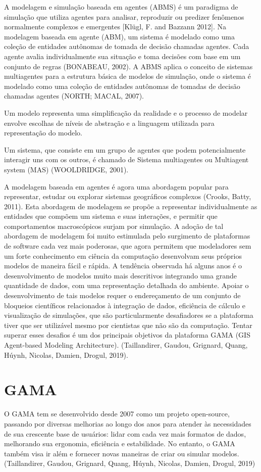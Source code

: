 A modelagem e simulação baseada em agentes (ABMS) é um paradigma de simulação que utiliza agentes para analisar, reproduzir ou predizer fenômenos normalmente complexos e emergentes [Klügl, F. and Bazzann 2012]. Na modelagem baseada em agente (ABM), um sistema é modelado como uma coleção de entidades autônomas de tomada de decisão chamadas agentes. Cada agente avalia individualmente sua situação e toma decisões com base em um conjunto de regras (BONABEAU, 2002). A ABMS aplica o conceito de sistemas multiagentes para a estrutura básica de modelos de simulação, onde o sistema é modelado como
uma coleção de entidades autônomas de tomadas de decisão chamadas agentes (NORTH; MACAL, 2007).

Um modelo representa uma simplificação da realidade e o processo de modelar envolve escolhas de níveis de abstração  e a linguagem utilizada para representação do modelo. 

Um sistema, que consiste em um grupo de agentes que podem potencialmente interagir uns com os outros, é chamado de Sistema multiagentes ou Multiagent
system (MAS) (WOOLDRIDGE, 2001).

A modelagem baseada em agentes é agora uma abordagem popular para representar, estudar ou explorar sistemas geográficos complexos (Crooks, Batty, 2011). Esta abordagem de modelagem se propõe a representar individualmente as entidades que compõem um sistema e suas interações, e permitir que  comportamentos macroscópicos surjam por simulação. A adoção de tal abordagem de modelagem foi muito estimulada pelo surgimento de plataformas de software cada vez mais poderosas, que agora permitem que modeladores sem um forte conhecimento em ciência da computação desenvolvam seus próprios modelos de maneira fácil e rápida. A tendência observada há alguns anos é o desenvolvimento de modelos muito mais descritivos integrando uma grande quantidade de dados, com uma representação detalhada do ambiente.
Apoiar o desenvolvimento de tais modelos requer o endereçamento de um conjunto de bloqueios científicos relacionados à integração de dados, eficiência de cálculo e visualização de simulações, que são particularmente desafiadores se a plataforma tiver que ser utilizável mesmo por cientistas que não são da computação. Tentar superar esses desafios é um dos principais objetivos da plataforma GAMA (GIS Agent-based Modeling Architecture).  (Taillandirer, Gaudou, Grignard, Quang, Húynh, Nicolas, Damien, Drogul, 2019).

\section{GAMA}%
O GAMA tem se desenvolvido desde 2007 como um projeto open-source, passando por diversas melhorias ao longo dos anos para atender às necessidades de sua crescente base de usuários: lidar com cada vez mais formatos de dados, melhorando sua ergonomia, eficiência e estabilidade. No entanto, o GAMA também visa ir além e fornecer novas maneiras de criar ou simular modelos.  (Taillandirer, Gaudou, Grignard, Quang, Húynh, Nicolas, Damien, Drogul, 2019)



